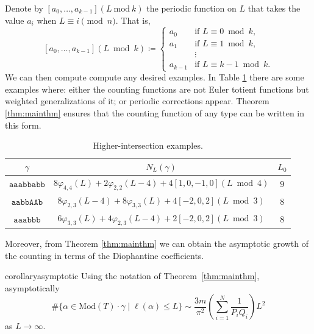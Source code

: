 \documentclass{article}
\newcommand{\Mod}{\mathrm{Mod}}
\begin{document}
\begin{examples}
		
		Denote by $[a_0,\hdots, a_{k-1}](L\ \mathrm{mod}\ k)$ the periodic function on $L$ that takes the value $a_i$ when $L\equiv i\pmod n$. That is, 
        \[
            [a_0, \dots, a_{k-1}](L \bmod k)
            \coloneqq
            \begin{cases}
                a_0 & \text{if } L \equiv 0 \bmod k, \\
                a_1 & \text{if } L \equiv 1 \bmod k, \\
                    & \vdots \\
                a_{k-1} & \text{if } L \equiv k-1 \bmod k.
        \end{cases}
        \]
        We can then compute compute any desired examples. In Table \ref{tab:exampleshigh} there are some examples where: either the counting functions are not Euler totient functions but weighted generalizations of it; or periodic corrections appear. Theorem \ref{thm:mainthm} ensures that the counting function of any type can be written in this form.
		
        \begin{table}[ht]
        \centering
        \begin{tabular}[t]{c|c|c}
            \toprule
            $\gamma$ & $N_L(\gamma)$ & $L_0$ \\
            \midrule
            $\mathtt{aaabbabb}$ & $8\varphi_{4,4}(L) + 2\varphi_{2,2}(L-4) + 4 [1, 0, -1, 0](L \bmod 4)$ & $9$ \\
            \midrule
            $\mathtt{aabbAAb}$ & $8\varphi_{2, 3} (L-4) + 8\varphi_{3, 3}(L) + 4 [-2, 0, 2](L \bmod 3)$ & $8$ \\
            \midrule
            $\mathtt{aaabbb}$ & $6\varphi_{3, 3} (L) + 4 \varphi_{2, 3}(L-4)+ 2 [-2, 0, 2](L \bmod 3)$ & $8$ \\
            \bottomrule
        \end{tabular}
        \caption{Higher-intersection examples.}
		\label{tab:exampleshigh}
    \end{table}
		
		
	\end{examples}
	
	Moreover, from Theorem \ref{thm:mainthm} we can obtain the asymptotic growth of the counting in terms of the Diophantine coefficients.
	
	\begin{restatable}{corollary}{asymptotic}\label{thm:asym}
		Using the notation of Theorem~\ref{thm:mainthm},
		asymptotically
		\[
		\# \{ \alpha \in \Mod(T) \cdot \gamma \mid \ell(\alpha) \leq L \}
		\sim
		\frac{3m}{\pi^2}
		\left( \sum_{i=1}^{N} \frac{1}{P_i Q_i} \right)
		L^2
		\]
		as $L \to \infty$.
	\end{restatable}
	
\end{document}
